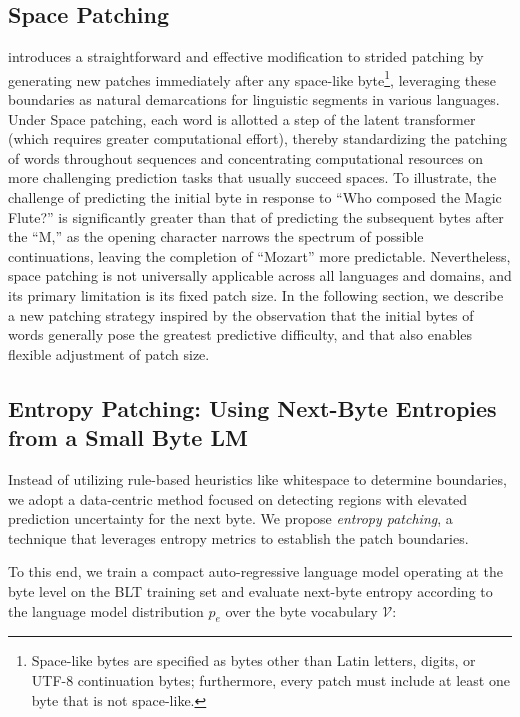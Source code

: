 \subsection{Space Patching}
\label{section:white-patch}

\citet{slagle2024spacebyte} introduces a straightforward and effective modification to strided patching by generating new patches immediately after any space-like byte\footnote{
    Space-like bytes are specified as bytes other than Latin letters, digits, or UTF-8 continuation bytes; furthermore, every patch must include at least one byte that is not space-like.}, leveraging these boundaries as natural demarcations for linguistic segments in various languages. Under Space patching, each word is allotted a step of the latent transformer (which requires greater computational effort), thereby standardizing the patching of words throughout sequences and concentrating computational resources on more challenging prediction tasks that usually succeed spaces. To illustrate, the challenge of predicting the initial byte in response to ``Who composed the Magic Flute?\uline{\hspace{.6em}}'' is significantly greater than that of predicting the subsequent bytes after the ``M,'' as the opening character narrows the spectrum of possible continuations, leaving the completion of ``Mozart'' more predictable. Nevertheless, space patching is not universally applicable across all languages and domains, and its primary limitation is its fixed patch size. In the following section, we describe a new patching strategy inspired by the observation that the initial bytes of words generally pose the greatest predictive difficulty, and that also enables flexible adjustment of patch size.

\subsection{Entropy Patching: Using Next-Byte Entropies from a Small Byte LM}
\label{section:dyn-patch}

Instead of utilizing rule-based heuristics like whitespace to determine boundaries, we adopt a data-centric method focused on detecting regions with elevated prediction uncertainty for the next byte. We propose \textit{entropy patching}, a technique that leverages entropy metrics to establish the patch boundaries.

To this end, we train a compact auto-regressive language model operating at the byte level on the {\textsc BLT} training set and evaluate next-byte entropy according to the language model distribution $p_{e}$ over the byte vocabulary $\mathcal{V}$:

